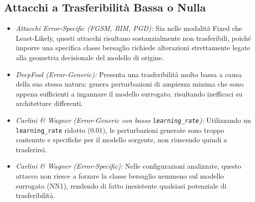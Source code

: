 \documentclass[a4paper, 12pt]{article}
\begin{document}
\subsection*{Attacchi a Trasferibilità Bassa o Nulla}
\begin{itemize}
    \item \textit{Attacchi Error-Specific (FGSM, BIM, PGD):} Sia nelle modalità Fixed che Least-Likely, questi attacchi risultano sostanzialmente non trasferibili, poiché imporre una specifica classe bersaglio richiede alterazioni strettamente legate alla geometria decisionale del modello di origine.
    \item \textit{DeepFool (Error-Generic):} Presenta una trasferibilità molto bassa a causa della sua stessa natura: genera perturbazioni di ampiezza minima che sono appena sufficienti a ingannare il modello surrogato, risultando inefficaci su architetture differenti.
    \item \textit{Carlini \& Wagner (Error-Generic con basso \texttt{learning\_rate}):} Utilizzando un \texttt{learning\_rate} ridotto ($0.01$), le perturbazioni generate sono troppo contenute e specifiche per il modello sorgente, non riuscendo quindi a trasferirsi.
    \item \textit{Carlini \& Wagner (Error-Specific):} Nelle configurazioni analizzate, questo attacco non riesce a forzare la classe bersaglio nemmeno sul modello surrogato (NN1), rendendo di fatto inesistente qualsiasi potenziale di trasferibilità.
\end{itemize}





\clearpage
\end{document}

